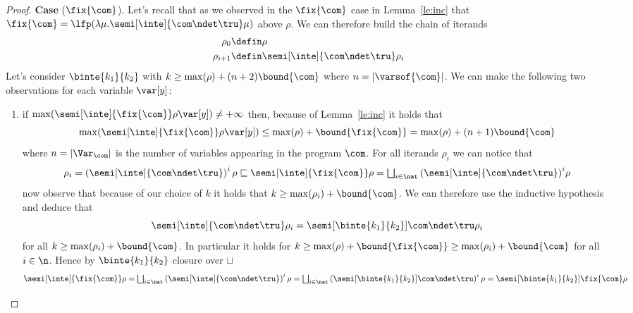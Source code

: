 \begin{proof}
  \noindent
  \textbf{Case} (\(\fix{\com}\)).
  Let's recall that as we observed in the \(\fix{\com}\) case in
  Lemma~\ref{le:inc} that
  \({\fix{\com} = \lfp(\lambda \mu . \semi[\inte]{\com \ndet
      \tru}\mu)}\) above \(\rho\). We can therefore build the chain of
  iterands
  \begin{align*}
    \rho_0 & \defin \rho \\
    \rho_{i+1} & \defin \semi[\inte]{\com \ndet \tru}\rho_i
  \end{align*}
  Let's consider \(\binte{k_1}{k_2}\) with
  \(k \geq \max(\rho) + (n+2)\bound{\com}\) where
  \(n = |\varsof{\com}|\). We can make the following two observations
  for each variable \(\var[y]\):
  \begin{enumerate}[label=(\roman*)]
  \item if
    \({\max(\semi[\inte]{\fix{\com}}\rho\var[y])} \neq +\infty\) then,
    because of Lemma~\ref{le:inc} it holds that
    \begin{equation*}
      \max(\semi[\inte]{\fix{\com}}\rho\var[y]) \leq \max(\rho) + \bound{\fix{\com}} = \max(\rho) + (n+1)\bound{\com}
    \end{equation*}
    where \(n = |\Var_{\com}|\) is the number of variables appearing
    in the program \(\com\). For all iterands \(\rho_i\) we can notice
    that
    \begin{equation*}
      \rho_i = \left(\semi[\inte]{\com \ndet \tru}\right)^i\rho \sqsubseteq \semi[\inte]{\fix{\com}}\rho = \textstyle\bigsqcup_{i\in\nat}{\left(\semi[\inte]{\com\ndet\tru}\right)}^i\rho
    \end{equation*}
    now observe that because of our choice of \(k\) it holds that
    \({k \geq \max(\rho_i) + \bound{\com}}\). We can therefore use the
    inductive hypothesis and deduce that
    \begin{equation*}
      \semi[\inte]{\com\ndet\tru}\rho_i = \semi[\binte{k_1}{k_2}]{\com\ndet\tru}\rho_i
    \end{equation*}
    for all \(k \geq \max(\rho_i) + \bound{\com}\). In particular it
    holds for
    \(k \geq \max(\rho) + \bound{\fix{\com}} \geq \max(\rho_i) +
    \bound{\com}\) for all \(i\in\n\). Hence by \(\binte{k_1}{k_2}\) closure
    over \(\sqcup\)
    \begin{equation*}
      \semi[\inte]{\fix{\com}}\rho
      =
      \textstyle\bigsqcup_{i\in\nat}\left(\semi[\inte]{\com\ndet\tru}\right)^i\rho
      =
      \textstyle\bigsqcup_{i\in\nat}\left(\semi[\binte{k_1}{k_2}]{\com\ndet\tru}\right)^i\rho
      =
      \semi[\binte{k_1}{k_2}]{\fix{\com}}\rho
    \end{equation*}
    

\end{enumerate}
\end{proof}
